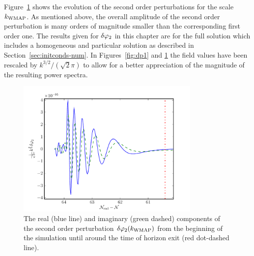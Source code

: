 Figure~\ref{fig:dp2realimag} shows the evolution of the second
order perturbations for the scale $k_\mathrm{WMAP}$. As mentioned above, the
overall amplitude of the second order perturbation is many orders of
magnitude smaller than the corresponding first order one. 
% 
The results given for $\delta\varphi_{2}$ in this
chapter are for the full solution which includes a homogeneous and particular solution as described in
Section~\ref{sec:initconds-num}.
% 
 In Figures~\ref{fig:dp1}
and \ref{fig:dp2realimag} the field values have been rescaled by
$k^{3/2}/(\sqrt{2}\pi)$ to allow for a better appreciation of the
magnitude of the resulting power spectra.
% 
\begin{figure}[htbp]
 \centering
 \includegraphics[width=0.8\textwidth]{numerical/graphs/dp2_kwmap}
 \caption[Second Order Perturbation]{The real (blue line) and imaginary (green
dashed) components of the
second order
perturbation $\delta\varphi_{2}(k_\mathrm{WMAP})$ from the beginning of the simulation until around
the time
of horizon exit (red dot-dashed line).}
\label{fig:dp2realimag}
\end{figure}
% 



